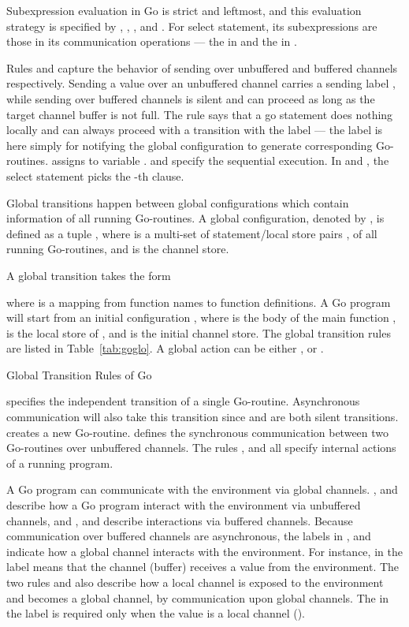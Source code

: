 \documentclass[runningheads, envcountsame, a4paper]{llncs}
\begin{document}
Subexpression evaluation in Go is strict and leftmost, and this evaluation strategy is specified by
, , ,  and .
For select statement, its subexpressions are those in its communication operations ---
the  in  and the  in .

Rules  and  capture the behavior of sending over unbuffered and buffered channels respectively.
Sending a value  over an unbuffered channel  carries a sending label ,
while sending over buffered channels is silent and can proceed as long as the target channel buffer is not full.
The  rule says that a go statement does nothing locally and can always proceed with a transition
with the  label ---  the label is here simply for notifying the global configuration to
generate corresponding Go-routines.
 assigns  to variable .  and  specify the sequential execution.
In  and , the select statement picks the -th clause.


Global transitions happen between global configurations which contain information of all running Go-routines.
A global configuration, denoted by , is defined as a tuple ,
where  is a multi-set of statement/local store pairs , of all running Go-routines,
and  is the channel store.

A global transition takes the form

where  is a mapping from function names to function definitions.
A Go program will start from an initial configuration
, where  is the body of the main function ,
 is the local store of , and  is the initial channel store.
The global transition rules are listed in Table~\ref{tab:goglo}.
A global action can be either ,  or .

\begin{table} {
 }
\caption{Global Transition Rules of Go}
\label{tab:goglo}
\end{table}

 specifies the independent transition of a single Go-routine.
Asynchronous communication will also take this transition since  and  are both silent transitions.
 creates a new Go-routine.
 defines the synchronous communication between two Go-routines over unbuffered channels.
The rules ,  and  all specify internal actions of a running program.

A Go program can communicate with the environment via global channels.
,  and  describe how a Go program interact with the environment via unbuffered channels,
and ,  and  describe interactions via buffered channels.
Because communication over buffered channels are asynchronous, the labels in ,  and 
indicate how a global channel interacts with the environment.
For instance, in  the label  means that the channel (buffer)  receives a value 
from the environment.
The two rules  and  also describe how a local channel is exposed to the environment and
becomes a global channel, by communication upon global channels.
The  in the label is required only when the value is a local channel ().
\end{document}
